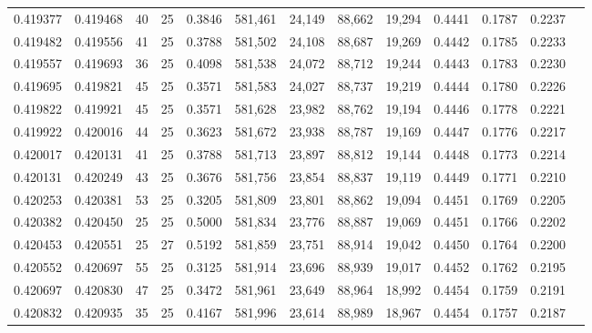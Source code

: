 \begin{tabular}{rrrrrrrrrrrrr}
0.419377 & 0.419468 &    40 &  25 &                                     0.3846 & 581,461 &  24,149 &  88,662 &  19,294 & 0.4441 & 0.1787 & 0.2237 \\
0.419482 & 0.419556 &    41 &  25 &                                     0.3788 & 581,502 &  24,108 &  88,687 &  19,269 & 0.4442 & 0.1785 & 0.2233 \\
0.419557 & 0.419693 &    36 &  25 &                                     0.4098 & 581,538 &  24,072 &  88,712 &  19,244 & 0.4443 & 0.1783 & 0.2230 \\
0.419695 & 0.419821 &    45 &  25 &                                     0.3571 & 581,583 &  24,027 &  88,737 &  19,219 & 0.4444 & 0.1780 & 0.2226 \\
0.419822 & 0.419921 &    45 &  25 &                                     0.3571 & 581,628 &  23,982 &  88,762 &  19,194 & 0.4446 & 0.1778 & 0.2221 \\
0.419922 & 0.420016 &    44 &  25 &                                     0.3623 & 581,672 &  23,938 &  88,787 &  19,169 & 0.4447 & 0.1776 & 0.2217 \\
0.420017 & 0.420131 &    41 &  25 &                                     0.3788 & 581,713 &  23,897 &  88,812 &  19,144 & 0.4448 & 0.1773 & 0.2214 \\
0.420131 & 0.420249 &    43 &  25 &                                     0.3676 & 581,756 &  23,854 &  88,837 &  19,119 & 0.4449 & 0.1771 & 0.2210 \\
0.420253 & 0.420381 &    53 &  25 &                                     0.3205 & 581,809 &  23,801 &  88,862 &  19,094 & 0.4451 & 0.1769 & 0.2205 \\
0.420382 & 0.420450 &    25 &  25 &                                     0.5000 & 581,834 &  23,776 &  88,887 &  19,069 & 0.4451 & 0.1766 & 0.2202 \\
0.420453 & 0.420551 &    25 &  27 &                                     0.5192 & 581,859 &  23,751 &  88,914 &  19,042 & 0.4450 & 0.1764 & 0.2200 \\
0.420552 & 0.420697 &    55 &  25 &                                     0.3125 & 581,914 &  23,696 &  88,939 &  19,017 & 0.4452 & 0.1762 & 0.2195 \\
0.420697 & 0.420830 &    47 &  25 &                                     0.3472 & 581,961 &  23,649 &  88,964 &  18,992 & 0.4454 & 0.1759 & 0.2191 \\
0.420832 & 0.420935 &    35 &  25 &                                     0.4167 & 581,996 &  23,614 &  88,989 &  18,967 & 0.4454 & 0.1757 & 0.2187 \\

\end{tabular}

